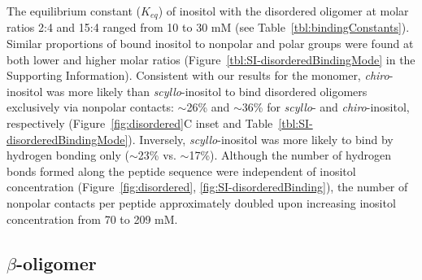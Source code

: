 The equilibrium constant ($K_{eq}$) of inositol with the disordered oligomer at molar ratios 2:4 and 15:4 ranged from 10 to 30 mM (see Table~\ref{tbl:bindingConstants}).
Similar proportions of bound inositol to nonpolar and polar groups were found at both lower and higher molar ratios (Figure~{\ref{tbl:SI-disorderedBindingMode}} in the Supporting Information). Consistent with our results for the monomer, \emph{chiro}-inositol was more likely than \emph{scyllo}-inositol to bind disordered oligomers exclusively via nonpolar contacts: $\sim$26\% and $\sim$36\% for \emph{scyllo}- and \emph{chiro}-inositol, respectively (Figure~\ref{fig:disordered}C inset and Table~\ref{tbl:SI-disorderedBindingMode}).  
Inversely, \emph{scyllo}-inositol was more likely to bind by hydrogen bonding only ($\sim$23\% vs. $\sim$17\%). Although the number of hydrogen bonds formed along the peptide sequence were independent of inositol concentration (Figure~\ref{fig:disordered}, \ref{fig:SI-disorderedBinding}), the number of nonpolar contacts per peptide approximately doubled upon increasing inositol concentration from 70 to 209 mM.

\subsection{$\beta$-oligomer}

